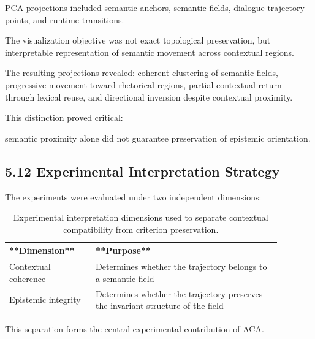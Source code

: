 \documentclass[11pt]{article}
\begin{document}
PCA projections included semantic anchors, semantic fields, dialogue trajectory points, and runtime transitions.

The visualization objective was not exact topological preservation, but interpretable representation of semantic movement across contextual regions.

The resulting projections revealed: coherent clustering of semantic fields, progressive movement toward rhetorical regions, partial contextual return through lexical reuse, and directional inversion despite contextual proximity.

This distinction proved critical:

semantic proximity alone did not guarantee preservation of epistemic orientation.

\subsection{5.12 Experimental Interpretation Strategy}

The experiments were evaluated under two independent dimensions:

\begin{table}[h]

\centering

\begin{tabular}{p{0.28\linewidth}p{0.60\linewidth}}

\hline

**Dimension** & **Purpose** \\

\hline

Contextual coherence & Determines whether the trajectory belongs to a semantic field \\

Epistemic integrity & Determines whether the trajectory preserves the invariant structure of the field \\

\hline

\end{tabular}

\caption{Experimental interpretation dimensions used to separate contextual compatibility from criterion preservation.}

\label{tab:experimental-interpretation-dimensions}

\end{table}

This separation forms the central experimental contribution of ACA.
\end{document}
